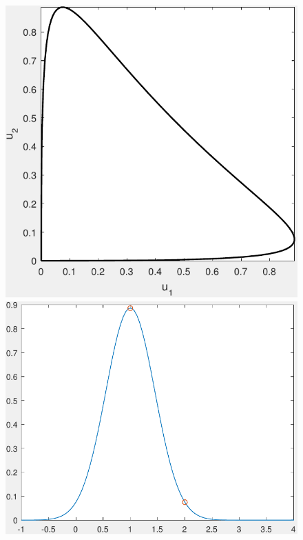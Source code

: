 \begin{figure}[ht]
\begin{minipage}[b]{0.3\linewidth}
			\end{minipage}
			\begin{minipage}[b]{0.3\linewidth}
				\includegraphics[width=\textwidth]{GammaTrace03}
			\end{minipage}
			\begin{minipage}[b]{0.3\linewidth}
				\includegraphics[width=\textwidth]{GammaTraceDensity01}

\end{minipage}
\end{figure}
